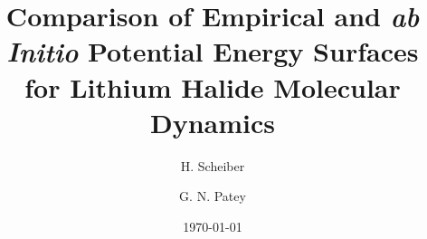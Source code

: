 \documentclass[preprint,aps,prb,floatfix]{revtex4-1}
\date{\today}
\begin{document}
%


\author{H. Scheiber}
\author{G. N. Patey}

\title{
	Comparison of Empirical and \emph{ab Initio} Potential Energy Surfaces for Lithium Halide Molecular Dynamics
}

\newcommand{\kJmol}{kJ mol$^{-1}$}
\newcommand{\boldr}{{\bm r}}

\begin{abstract}


\end{abstract}

\maketitle
\end{document}
